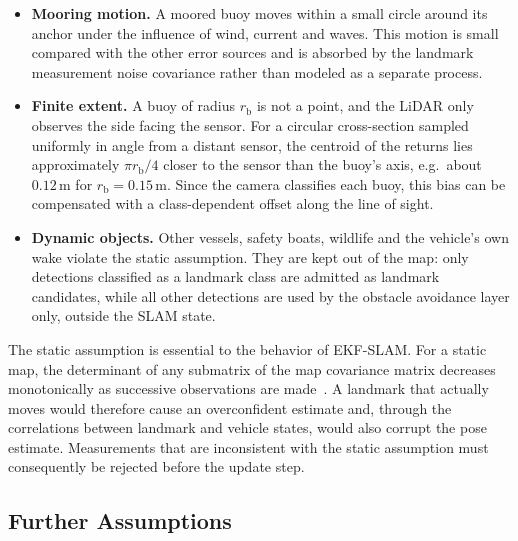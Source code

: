 \begin{itemize}
  \item \textbf{Mooring motion.} A moored buoy moves within a small circle
  around its anchor under the influence of wind, current and waves. This
  motion is small compared with the other error sources and is absorbed by
  the landmark measurement noise covariance rather than modeled as a
  separate process.

  \item \textbf{Finite extent.} A buoy of radius $r_\mathrm{b}$ is not a
  point, and the LiDAR only observes the side facing the sensor. For a
  circular cross-section sampled uniformly in angle from a distant sensor,
  the centroid of the returns lies approximately $\pi r_\mathrm{b} / 4$
  closer to the sensor than the buoy's axis, e.g.\ about $0.12\,\mathrm{m}$
  for $r_\mathrm{b} = 0.15\,\mathrm{m}$. Since the camera classifies each
  buoy, this bias can be compensated with a class-dependent offset along
  the line of sight.

  \item \textbf{Dynamic objects.} Other vessels, safety boats, wildlife and
  the vehicle's own wake violate the static assumption. They are kept out
  of the map: only detections classified as a landmark class are admitted
  as landmark candidates, while all other detections are used by the
  obstacle avoidance layer only, outside the SLAM state.
\end{itemize}

The static assumption is essential to the behavior of EKF-SLAM. For a
static map, the determinant of any submatrix of the map covariance matrix
decreases monotonically as successive observations are
made~\cite{dissanayake2001}. A landmark that actually moves would therefore
cause an overconfident estimate and, through the correlations between
landmark and vehicle states, would also corrupt the pose estimate.
Measurements that are inconsistent with the static assumption must
consequently be rejected before the update step.

\subsection{Further Assumptions}
\label{sec:assumption-further}

